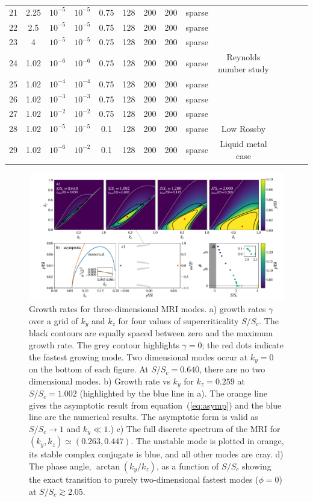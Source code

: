 \documentclass[openacc]{rsproca_new}%
\newcommand{\SSC}{S/S_{c}}
\begin{document}
\begin{tabular}{cccccccccccccc}
21 & 2.25   & $10^{-5}$ & $10^{-5}$ & 0.75 & 128 & 200 & 200 & sparse & \\
22 & 2.5    & $10^{-5}$ & $10^{-5}$ & 0.75 & 128 & 200 & 200 & sparse & \\
23 & 4      & $10^{-5}$ & $10^{-5}$ & 0.75 & 128 & 200 & 200 & sparse & \\
24 & 1.02   & $10^{-6}$ & $10^{-6}$ & 0.75 & 128 & 200 & 200 & sparse & Reynolds number study\\
25 & 1.02   & $10^{-4}$ & $10^{-4}$ & 0.75 & 128 & 200 & 200 & sparse & \\
26 & 1.02   & $10^{-3}$ & $10^{-3}$ & 0.75 & 128 & 200 & 200 & sparse & \\
27 & 1.02   & $10^{-2}$ & $10^{-2}$ & 0.75 & 128 & 200 & 200 & sparse & \\
28 & 1.02   & $10^{-5}$ & $10^{-5}$ & 0.1  & 128 & 200 & 200 & sparse & Low Rossby\\ 
29 & 1.02   & $10^{-6}$ & $10^{-2}$ & 0.1  & 128 & 200 & 200 & sparse & Liquid metal case\\ 
\end{tabular}

\begin{figure}[ht]
  \includegraphics[width=\textwidth]{fig_1.pdf}
  \caption{Growth rates for three-dimensional MRI modes. 
  a) growth rates $\gamma$ over a grid of $k_{y}$ and $k_{z}$ for four values of supercriticality $\SSC$. 
  The black contours are equally spaced between zero and the maximum growth rate.
  The grey contour highlights $\gamma=0$; the red dots indicate the fastest growing mode. 
Two dimensional modes occur at $k_y = 0$ on the bottom of each figure.
  At $\SSC=0.640$, there are no two dimensional modes. 
  b) Growth rate vs $k_{y}$ for $k_{z}=0.259$ at $\SSC=1.002$ (highlighted by the blue line in a). 
  The orange line gives the asymptotic result from equation~(\ref{eq:asymp}) and the blue line are the numerical results. 
  The asymptotic form is valid as $\SSC\to1$ and $k_{y}\ll1$.) c) The full discrete spectrum of the MRI for $(k_{y},k_{z})\simeq(0.263,0.447)$. 
  The unstable mode is plotted in orange, its stable complex conjugate is blue, and all other modes are cray. 
  d) The phase angle, $\arctan(k_{y}/k_{z})$, as a function of $\SSC$ showing the exact transition to purely two-dimensional fastest modes ($\phi=0$) at $\SSC\gtrsim2.05$. }
  \label{fig:growth_rate}
\end{figure}
\end{document}
